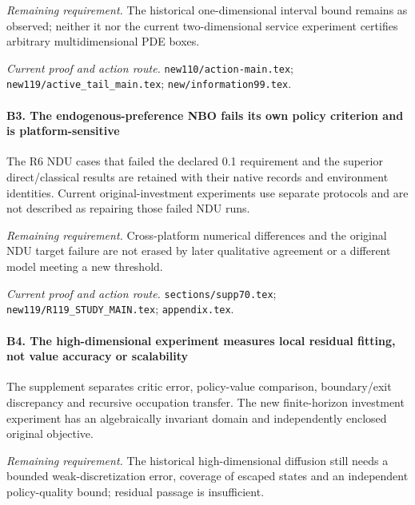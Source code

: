 \par\emph{Remaining requirement.} The historical one-dimensional interval bound remains as observed; neither it nor the current two-dimensional service experiment certifies arbitrary multidimensional PDE boxes.

\par\emph{Current proof and action route.} \nolinkurl{new110/action-main.tex}; \nolinkurl{new119/active_tail_main.tex}; \nolinkurl{new/information99.tex}.

\paragraph{B3. The endogenous-preference NBO fails its own policy criterion and is platform-sensitive}

The R6 NDU cases that failed the declared 0.1 requirement and the superior direct/\allowbreak{}classical results are retained with their native records and environment identities. Current original-investment experiments use separate protocols and are not described as repairing those failed NDU runs.

\par\emph{Remaining requirement.} Cross-platform numerical differences and the original NDU target failure are not erased by later qualitative agreement or a different model meeting a new threshold.

\par\emph{Current proof and action route.} \nolinkurl{sections/supp70.tex}; \nolinkurl{new119/R119_STUDY_MAIN.tex}; \nolinkurl{appendix.tex}.

\paragraph{B4. The high-dimensional experiment measures local residual fitting, not value accuracy or scalability}

The supplement separates critic error, policy-value comparison, boundary/\allowbreak{}exit discrepancy and recursive occupation transfer. The new finite-horizon investment experiment has an algebraically invariant domain and independently enclosed original objective.

\par\emph{Remaining requirement.} The historical high-dimensional diffusion still needs a bounded weak-discretization error, coverage of escaped states and an independent policy-quality bound; residual passage is insufficient.

